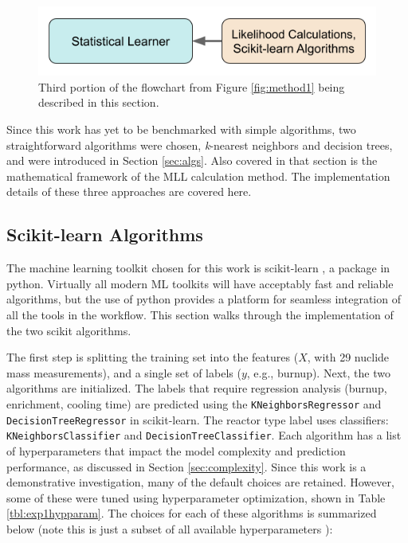 
\begin{figure}[H]
  \centering
  \includegraphics[width=0.7\linewidth]{./chapters/exp1/methodology1_3.png}
  \caption[Third portion of the flowchart from Figure \ref{fig:method1}]
          {Third portion of the flowchart from Figure \ref{fig:method1} being 
           described in this section.}
\end{figure}

Since this work has yet to be benchmarked with simple algorithms, two
straightforward algorithms were chosen, \textit{k}-nearest neighbors and
decision trees, and were introduced in Section \ref{sec:algs}. Also covered in
that section is the mathematical framework of the \gls{MLL} calculation method.
The implementation details of these three approaches are covered here. 

\subsection{Scikit-learn Algorithms}

The machine learning toolkit chosen for this work is scikit-learn
\cite{scikit}, a package in python.  Virtually all modern \gls{ML} toolkits
will have acceptably fast and reliable algorithms, but the use of python
provides a platform for seamless integration of all the tools in the workflow.
This section walks through the implementation of the two scikit algorithms. 


The first step is splitting the training set into the features ($X$, with 29
nuclide mass measurements), and a single set of labels ($y$, e.g., burnup).
Next, the two algorithms are initialized.  The labels that require regression
analysis (burnup, enrichment, cooling time) are predicted using the
\texttt{KNeighborsRegressor} and \texttt{DecisionTreeRegressor} in
scikit-learn. The reactor type label uses classifiers:
\texttt{KNeighborsClassifier} and \texttt{DecisionTreeClassifier}.  Each
algorithm has a list of hyperparameters that impact the model complexity and
prediction performance, as discussed in Section \ref{sec:complexity}. Since
this work is a demonstrative investigation, many of the default choices are
retained. However, some of these were tuned using hyperparameter optimization,
shown in Table \ref{tbl:exp1hypparam}.  The choices for each of these
algorithms is summarized below (note this is just a subset of all available
hyperparameters \cite{scikit}):

